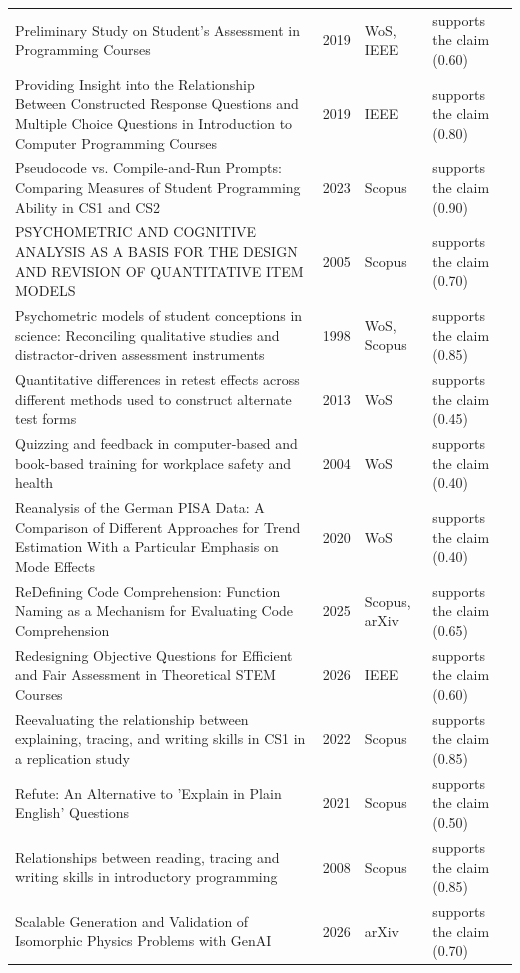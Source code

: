 \begin{longtable}{@{}%
  >{\raggedright\arraybackslash}p{}c%
  >{\raggedright\arraybackslash}p{}%
  >{\raggedright\arraybackslash}p{}@{}}
Preliminary Study on Student's Assessment in Programming Courses & 2019 & WoS, IEEE & supports the claim (0.60) \\
Providing Insight into the Relationship Between Constructed Response Questions and Multiple Choice Questions in Introduction to Computer Programming Courses & 2019 & IEEE & supports the claim (0.80) \\
Pseudocode vs. Compile-and-Run Prompts: Comparing Measures of Student Programming Ability in CS1 and CS2 & 2023 & Scopus & supports the claim (0.90) \\
PSYCHOMETRIC AND COGNITIVE ANALYSIS AS A BASIS FOR THE DESIGN AND REVISION OF QUANTITATIVE ITEM MODELS & 2005 & Scopus & supports the claim (0.70) \\
Psychometric models of student conceptions in science: Reconciling qualitative studies and distractor-driven assessment instruments & 1998 & WoS, Scopus & supports the claim (0.85) \\
Quantitative differences in retest effects across different methods used to construct alternate test forms & 2013 & WoS & supports the claim (0.45) \\
Quizzing and feedback in computer-based and book-based training for workplace safety and health & 2004 & WoS & supports the claim (0.40) \\
Reanalysis of the German PISA Data: A Comparison of Different Approaches for Trend Estimation With a Particular Emphasis on Mode Effects & 2020 & WoS & supports the claim (0.40) \\
ReDefining Code Comprehension: Function Naming as a Mechanism for Evaluating Code Comprehension & 2025 & Scopus, arXiv & supports the claim (0.65) \\
Redesigning Objective Questions for Efficient and Fair Assessment in Theoretical STEM Courses & 2026 & IEEE & supports the claim (0.60) \\
Reevaluating the relationship between explaining, tracing, and writing skills in CS1 in a replication study & 2022 & Scopus & supports the claim (0.85) \\
Refute: An Alternative to 'Explain in Plain English' Questions & 2021 & Scopus & supports the claim (0.50) \\
Relationships between reading, tracing and writing skills in introductory programming & 2008 & Scopus & supports the claim (0.85) \\
Scalable Generation and Validation of Isomorphic Physics Problems with GenAI & 2026 & arXiv & supports the claim (0.70) \\

\end{longtable}
